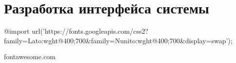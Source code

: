 \section{Разработка интерфейса системы}

@import url('https://fonts.googleapis.com/css2?family=Lato:wght@400;700&family=Nunito:wght@400;700&display=swap');

fontawesome.com








\clearpage
